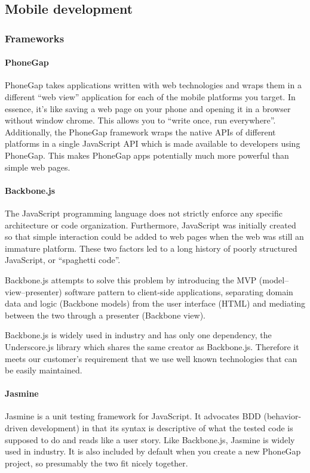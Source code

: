 \subsection{Mobile development}

\subsubsection{Frameworks}

\paragraph{PhoneGap}
PhoneGap takes applications written with web technologies and wraps them in
a different ``web view'' application for each of the mobile platforms you
target. In essence, it's like saving a web page on your phone and opening
it in a browser without window chrome. This allows you to ``write once, run
everywhere''. Additionally, the PhoneGap framework wraps the native APIs of
different platforms in a single JavaScript API which is made available to
developers using PhoneGap. This makes PhoneGap apps potentially much more
powerful than simple web pages.

\paragraph{Backbone.js}
The JavaScript programming language does not strictly enforce any specific
architecture or code organization. Furthermore, JavaScript was initially
created so that simple interaction could be added to web pages when the web was
still an immature platform. These two factors led to a long history of poorly
structured JavaScript, or ``spaghetti code''.

Backbone.js attempts to solve this problem by introducing the MVP
(model--view--presenter) software pattern to client-side applications,
separating domain data and logic (Backbone models) from the user interface
(HTML) and mediating between the two through a presenter (Backbone view).

Backbone.js is widely used in industry and has only one dependency, the
Underscore.js library which shares the same creator as Backbone.js.
Therefore it meets our customer's requirement that we use well known
technologies that can be easily maintained.

\paragraph{Jasmine}
Jasmine is a unit testing framework for JavaScript. It advocates BDD
(behavior-driven development) in that its syntax is descriptive of what the
tested code is supposed to do and reads like a user story. Like Backbone.js,
Jasmine is widely used in industry. It is also included by default when you
create a new PhoneGap project, so presumably the two fit nicely together.

